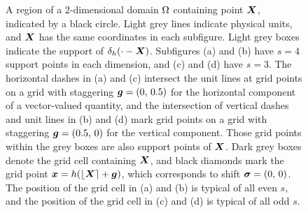 \begin{figure}[tb]
\begin{center}
    \end{center}

    \caption{%
A region of a 2-dimensional domain $\Omega$ containing point $\boldsymbol{X}$, indicated
by a black circle. Light grey lines indicate physical units, and $\boldsymbol{X}$ has the
same coordinates in each subfigure. Light grey boxes indicate the support of
$\delta_h(\cdot-\boldsymbol{X})$. Subfigures (a) and (b) have $s=4$ support points in each
dimension, and (c) and (d) have $s=3$. The horizontal dashes in (a) and (c)
intersect the unit lines at grid points on a grid with staggering
$\boldsymbol{g}=(0,\,0.5)$ for the horizontal component of a vector-valued quantity, and
the intersection of vertical dashes and unit lines in (b) and (d) mark grid
points on a grid with staggering $\boldsymbol{g}=(0.5,\,0)$ for the vertical component.
Those grid points within the grey boxes are also support points of $\boldsymbol{X}$. Dark
grey boxes denote the grid cell containing $\boldsymbol{X}$, and black diamonds mark the
grid point $\boldsymbol{x}=h(\left\lfloor{\boldsymbol{X}}\right\rceil+\boldsymbol{g})$, which corresponds to shift $\boldsymbol{\sigma}=(0,\,0)$.
The position of the grid cell in (a) and (b) is typical of all even $s$, and
the position of the grid cell in (c) and (d) is typical of all odd $s$.
    }
    \label{fig:grid}
\end{figure}

